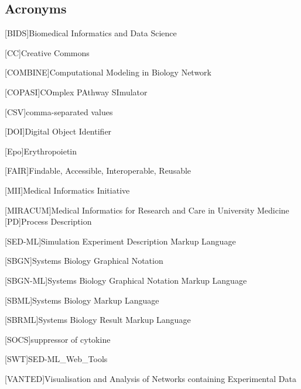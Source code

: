 \subsection*{Acronyms}
    \begin{acronym}[acrmeta]
        
        [BIDS]{Biomedical Informatics and Data Science}
       
       [CC]{Creative Commons}
       
       
        [COMBINE]{Computational Modeling in Biology Network}
        
        [COPASI]{COmplex PAthway SImulator}
        
        [CSV]{comma-separated values}
        
        [DOI]{Digital Object Identifier}
        
        [Epo]{Erythropoietin}
        
        [FAIR]{Findable, Accessible, Interoperable, Reusable}
        
        [MII]{Medical Informatics Initiative}
        
        [MIRACUM]{Medical Informatics for Research and Care in University
Medicine}
        [PD]{Process Description}
        
        [SED-ML]{Simulation Experiment Description Markup Language}
        
        [SBGN]{Systems Biology Graphical Notation}
        
        [SBGN-ML]{Systems Biology Graphical Notation Markup Language}
        
        [SBML]{Systems Biology Markup Language}
        
        [SBRML]{Systems Biology Result Markup Language}
        
        [SOCS]{suppressor of cytokine}
        
                [SWT]{SED-ML\_Web\_Tools}
        
        [VANTED]{Visualisation and Analysis of Networks containing Experimental Data}

    \end{acronym}
